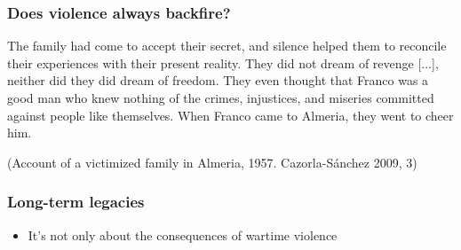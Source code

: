 \documentclass[aspectratio=43]{beamer}
\begin{document}
\begin{frame}
\frametitle{Does violence always backfire?}
\centering

{\small The family had come to accept their secret, and silence helped them to reconcile their experiences with their present reality. They did not dream of revenge [...], neither did they did dream of freedom. {\color{red} They even thought that Franco was a good man who knew nothing of the crimes, injustices, and miseries committed against people like themselves.} When Franco came to Almeria, they went to cheer him.}

{\scriptsize (Account of a victimized family in Almeria, 1957. Cazorla-Sánchez 2009, 3)}\\

\end{frame}

  




\begin{frame}
\frametitle{Long-term legacies}
\centering

\begin{itemize}
  \item It's not only about the consequences of wartime violence
\end{itemize}

\end{frame}


\end{document}
